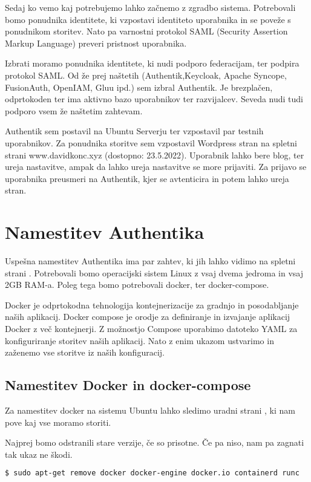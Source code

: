 \documentclass[a4paper,12pt,openright]{book}
\begin{document}
Sedaj ko vemo kaj potrebujemo lahko začnemo z zgradbo sistema. Potrebovali bomo ponudnika identitete, ki vzpostavi identiteto uporabnika in se poveže s ponudnikom storitev. Nato pa varnostni protokol SAML (Security Assertion Markup Language) preveri pristnost uporabnika. 

Izbrati moramo ponudnika identitete, ki nudi podporo federacijam, ter podpira protokol SAML. Od že prej naštetih (Authentik,Keycloak, Apache Syncope, FusionAuth, OpenIAM, Gluu ipd.) sem izbral Authentik. Je brezplačen, odprtokoden ter ima aktivno bazo uporabnikov ter razvijalcev. Seveda nudi tudi podporo vsem že naštetim zahtevam.  
\newline

Authentik sem postavil na Ubuntu Serverju ter vzpostavil par testnih uporabnikov. Za ponudnika storitve sem vzpostavil Wordpress stran na spletni strani www.davidkonc.xyz (dostopno: 23.5.2022). Uporabnik lahko bere blog, ter ureja nastavitve, ampak da lahko ureja nastavitve se more prijaviti. Za prijavo se uporabnika preusmeri na Authentik, kjer se avtenticira in potem lahko ureja stran. 

 \section{Namestitev Authentika}

Uspešna namestitev Authentika ima par zahtev, ki jih lahko vidimo na spletni strani \cite{AuthentikLink}.
Potrebovali bomo operacijski sistem Linux z vsaj dvema jedroma in vsaj 2GB RAM-a. Poleg tega bomo potrebovali docker, ter docker-compose. 

Docker je odprtokodna tehnologija kontejnerizacije za gradnjo in posodabljanje naših aplikacij.
Docker compose je orodje za definiranje in izvajanje aplikacij Docker z več kontejnerji. Z možnostjo Compose uporabimo datoteko YAML za konfiguriranje storitev naših aplikacij. Nato z enim ukazom ustvarimo in zaženemo vse storitve iz naših konfiguracij.
\subsection{Namestitev Docker in docker-compose}

Za namestitev docker na sistemu Ubuntu lahko sledimo uradni strani \cite{DockerLink}, ki nam pove kaj vse moramo storiti. 

Najprej bomo odstranili stare verzije, če so prisotne. Če pa niso, nam pa zagnati tak ukaz ne škodi.


\begin{lstlisting}[language=bash]
 $ sudo apt-get remove docker docker-engine docker.io containerd runc
\end{lstlisting}
\end{document}

